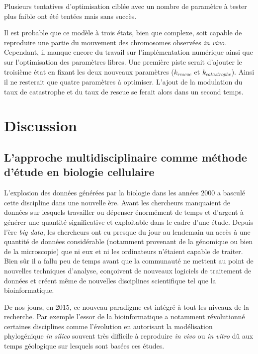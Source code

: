\documentclass[12pt,a4paper,twoside,openright]{book}
\begin{document}
Plusieurs tentatives d'optimisation ciblée avec un nombre de paramètre à
tester plus faible ont été tentées mais sans succès.

Il est probable que ce modèle à trois états, bien que complexe, soit
capable de reproduire une partie du mouvement des chromosomes observées
\emph{in vivo}. Cependant, il manque encore du travail sur
l'implémentation numérique ainsi que sur l'optimisation des paramètres
libres. Une première piste serait d'ajouter le troisième état en fixant
les deux nouveaux paramètres (\(k_{rescue}\) et \(k_{catastrophe}\)).
Ainsi il ne resterait que quatre paramètres à optimiser. L'ajout de la
modulation du taux de catastrophe et du taux de rescue se ferait alors
dans un second temps.

\chapter{Discussion}\label{discussion}

\section{L'approche multidisciplinaire comme méthode d'étude en biologie
cellulaire}\label{lapproche-multidisciplinaire-comme-muxe9thode-duxe9tude-en-biologie-cellulaire}

L'explosion des données générées par la biologie dans les années 2000 a
basculé cette discipline dans une nouvelle ère. Avant les chercheurs
manquaient de données sur lesquels travailler ou dépenser énormément de
temps et d'argent à générer une quantité significative et exploitable
dans le cadre d'une étude. Depuis l'ère \emph{big data}, les chercheurs
ont eu presque du jour au lendemain un accès à une quantité de données
considérable (notamment provenant de la génomique ou bien de la
microscopie) que ni eux et ni les ordinateurs n'étaient capable de
traiter. Bien sûr il a fallu peu de temps avant que la communauté ne
mettent au point de nouvelles techniques d'analyse, conçoivent de
nouveaux logiciels de traitement de données et créent même de nouvelles
disciplines scientifique tel que la bioinformatique.

De nos jours, en 2015, ce nouveau paradigme est intégré à tout les
niveaux de la recherche. Par exemple l'essor de la bioinformatique a
notamment révolutionné certaines disciplines comme l'évolution en
autorisant la modélisation phylogénique \emph{in silico} souvent très
difficile à reproduire \emph{in vivo} ou \emph{in vitro} dû aux temps
géologique sur lesquels sont basées ces études.
\end{document}
